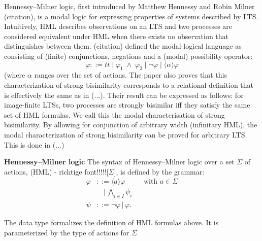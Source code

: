 %
\begin{isabellebody}%
%
%
\isadelimtheory
%
\endisadelimtheory
%
\isatagtheory
%
\endisatagtheory
{\isafoldtheory}%
%
\isadelimtheory
%
\endisadelimtheory
%
\isadelimdocument
%
\endisadelimdocument
%
\isatagdocument
%
\isamarkuptrue%
%
\endisatagdocument
{\isafolddocument}%
%
\isadelimdocument
%
\endisadelimdocument
%
\begin{isamarkuptext}%
Hennessy--Milner logic, first introduced by Matthew Hennessy and Robin Milner (citation), is a modal logic for expressing properties of systems described by LTS.
Intuitively, HML describes observations on an LTS and two processes are considered equivalent under HML when there exists no observation that distinguishes between them.
(citation) defined the modal-logical language as consisting of (finite) conjunctions, negations and a (modal) possibility operator:
$$\varphi ::= t\!t \mid \varphi_1 \;\wedge\; \varphi_2 \mid \neg\varphi \mid \langle\alpha\rangle\varphi$$
(where $\alpha$ ranges over the set of actions. The paper also proves that this characterization of strong bisimilarity
corresponds to a relational definition that is effectively the same as in (...). Their result can be expressed as follows:
for image-finite LTSs, two processes are strongly bisimilar iff they satisfy the same set of HML formulas. We call this the modal characterisation of
strong bisimilarity. By allowing for conjunction of arbitrary width (infinitary HML), the modal characterization of strong bisimilarity can be proved for arbitrary LTS. This is done in (...)%
\end{isamarkuptext}\isamarkuptrue%
%
\begin{isamarkuptext}%
\textbf{Hennessy--Milner logic}
The syntax of Hennessy--Milner logic over a set $\Sigma$ of actions, (HML) - richtige font!!!!![$\Sigma$], is defined by the grammar:
\begin{align*}
    \varphi &::= \langle a \rangle \varphi && \text{with } a \in \Sigma \\
            &\quad | \, \bigwedge_{i \in I} \psi_i \\
    \psi &::= \neg \varphi \, | \, \varphi.
\end{align*}%
\end{isamarkuptext}\isamarkuptrue%
%
\begin{isamarkuptext}%
The data type  formalizes the definition of HML formulas above. It is parameterized by the type of actions  for $\Sigma$

\end{isamarkuptext}
\end{isabellebody}
